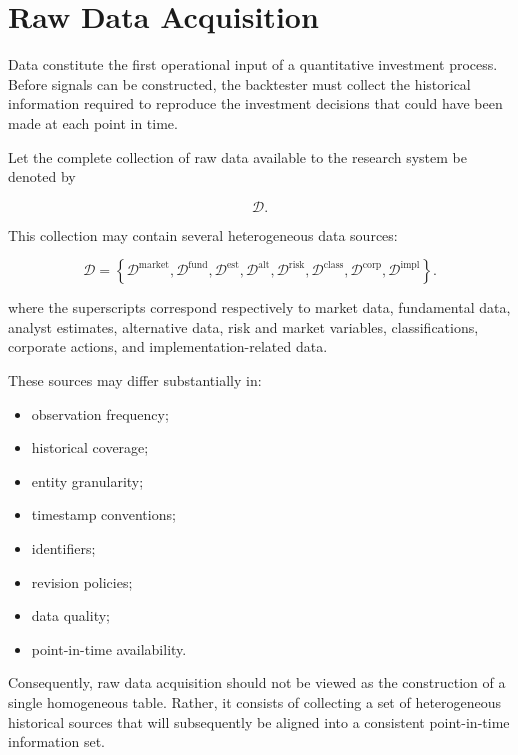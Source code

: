 \documentclass[11pt,a4paper]{article}
\begin{document}
\section{Raw Data Acquisition}
\label{sec:raw_data_acquisition}

Data constitute the first operational input of a quantitative investment
process. Before signals can be constructed, the backtester must collect the
historical information required to reproduce the investment decisions that
could have been made at each point in time.

Let the complete collection of raw data available to the research system be
denoted by

\begin{equation}
\mathcal{D}.
\end{equation}

This collection may contain several heterogeneous data sources:

\begin{equation}
\boxed{
\mathcal{D}
=
\left\{
\mathcal{D}^{\mathrm{market}},
\mathcal{D}^{\mathrm{fund}},
\mathcal{D}^{\mathrm{est}},
\mathcal{D}^{\mathrm{alt}},
\mathcal{D}^{\mathrm{risk}},
\mathcal{D}^{\mathrm{class}},
\mathcal{D}^{\mathrm{corp}},
\mathcal{D}^{\mathrm{impl}}
\right\}.
}
\end{equation}

where the superscripts correspond respectively to market data, fundamental
data, analyst estimates, alternative data, risk and market variables,
classifications, corporate actions, and implementation-related data.

These sources may differ substantially in:

\begin{itemize}
    \item observation frequency;
    \item historical coverage;
    \item entity granularity;
    \item timestamp conventions;
    \item identifiers;
    \item revision policies;
    \item data quality;
    \item point-in-time availability.
\end{itemize}

Consequently, raw data acquisition should not be viewed as the construction of
a single homogeneous table. Rather, it consists of collecting a set of
heterogeneous historical sources that will subsequently be aligned into a
consistent point-in-time information set.
\end{document}
